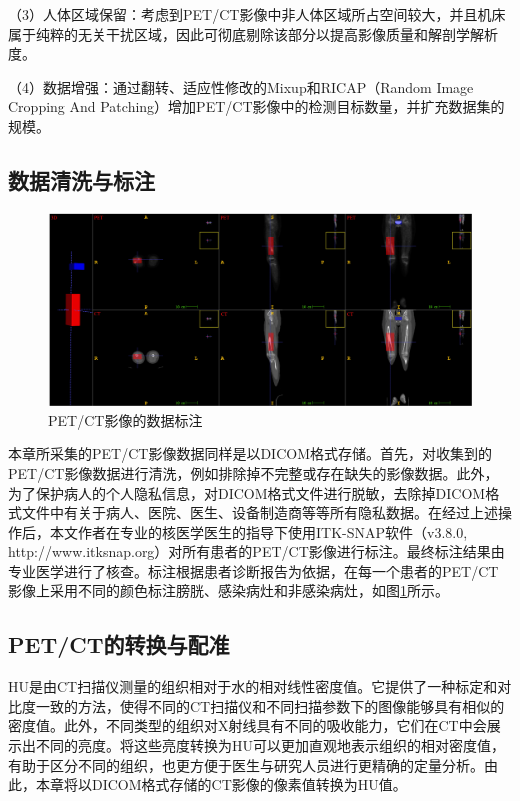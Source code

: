 （3）人体区域保留：考虑到PET/CT影像中非人体区域所占空间较大，并且机床属于纯粹的无关干扰区域，因此可彻底剔除该部分以提高影像质量和解剖学解析度。

（4）数据增强：通过翻转、适应性修改的Mixup和RICAP（Random Image Cropping And Patching）增加PET/CT影像中的检测目标数量，并扩充数据集的规模。

\subsection{数据清洗与标注}

\begin{figure}[htbp]
  \centering
  \includegraphics[width=\textwidth]{figures/chap04_label.jpg}
  \caption{PET/CT影像的数据标注}
  \label{fig:chap04_label}
\end{figure}

本章所采集的PET/CT影像数据同样是以DICOM格式存储。首先，对收集到的PET/CT影像数据进行清洗，例如排除掉不完整或存在缺失的影像数据。此外，为了保护病人的个人隐私信息，对DICOM格式文件进行脱敏，去除掉DICOM格式文件中有关于病人、医院、医生、设备制造商等等所有隐私数据。在经过上述操作后，本文作者在专业的核医学医生的指导下使用ITK-SNAP软件（v3.8.0, http://www.itksnap.org）对所有患者的PET/CT影像进行标注。最终标注结果由专业医学进行了核查。标注根据患者诊断报告为依据，在每一个患者的PET/CT影像上采用不同的颜色标注膀胱、感染病灶和非感染病灶，如图\ref{fig:chap04_label}所示。

\subsection{PET/CT的转换与配准}

HU是由CT扫描仪测量的组织相对于水的相对线性密度值。它提供了一种标定和对比度一致的方法，使得不同的CT扫描仪和不同扫描参数下的图像能够具有相似的密度值。此外，不同类型的组织对X射线具有不同的吸收能力，它们在CT中会展示出不同的亮度。将这些亮度转换为HU可以更加直观地表示组织的相对密度值，有助于区分不同的组织，也更方便于医生与研究人员进行更精确的定量分析。由此，本章将以DICOM格式存储的CT影像的像素值转换为HU值。

